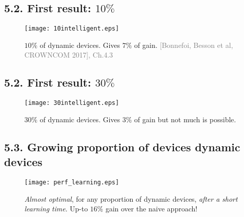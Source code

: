 \subsection{\hfill{}5.2. First result: $10\%$\hfill{}}

\begin{frameO}

    \begin{figure}[h!]
        \centering
        \texttt{[image: 10intelligent.eps]}
        \caption{\small{$10\%$ of dynamic devices. Gives $7\%$ of gain.} {\tiny \textcolor{gray}{[Bonnefoi, Besson et al, CROWNCOM 2017], Ch.4.3}}}
    \end{figure}

\end{frameO}



\subsection{\hfill{}5.2. First result: $30\%$\hfill{}}

\begin{frameO}

    \begin{figure}[h!]
        \centering
        \texttt{[image: 30intelligent.eps]}
        \caption{\small{$30\%$ of dynamic devices. Gives $3\%$ of gain but not much is possible.}}
    \end{figure}

\end{frameO}



\subsection{\hfill{}5.3. Growing proportion of devices dynamic devices\hfill{}}

\begin{frameO}[Dependency on \(D/(S+D)\)]

    \begin{figure}[h!]
        \centering
        \texttt{[image: perf\_learning.eps]}
        \caption{\small{\emph{Almost optimal}, for any proportion of dynamic devices, \emph{after a short learning time}. Up-to $16\%$ gain over the naive approach!}}
    \end{figure}

\end{frameO}
